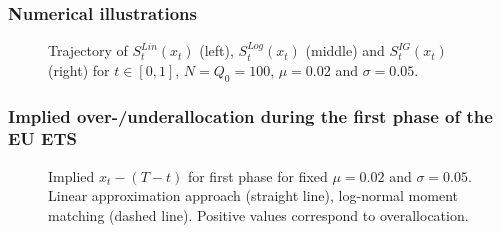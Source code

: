 \begin{frame}
  \frametitle{Numerical illustrations}
\begin{center}
\begin{figure}[h!]
\centering
{}
\caption{Trajectory of $S_t^{Lin}(x_t)$ (left), $S_t^{Log}(x_t)$ (middle) and $S_t^{IG}(x_t)$ (right) for $t \in [0,1]$,  $N = Q_0 = 100$, $\mu = 0.02$ and $\sigma = 0.05$.}
\label{fig:plot8}
\end{figure}
\end{center}
\end{frame}


\begin{frame}
  \frametitle{Implied over-/underallocation during the first phase of the EU ETS}
\begin{center}
\begin{figure}[h!]
\centering
{}
\caption{\tiny Implied $x_t - (T-t)$ for first phase for fixed  $\mu = 0.02$ and $\sigma = 0.05$. Linear approximation approach (straight line), log-normal moment matching (dashed line). Positive values correspond to overallocation.}
\label{fig:plot10}
\end{figure}
\end{center}
\end{frame}



